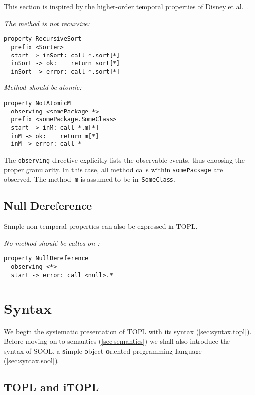 \documentclass{sigplanconf} %
\newcommand{\delimitVerbatim}{\par\nobreak\smallskip\noindent}
\theoremstyle{definition}
\theoremstyle{remark}
\begin{document}
This section is inspired by the higher-order temporal properties of Disney et al.~\cite{disney2011}.

\medskip\emph{The \Verb@sort@ method is not recursive:}
\delimitVerbatim
\begin{Verbatim}[commandchars=\\\{\}]
property RecursiveSort
  prefix <Sorter>
  start -> inSort: call *.sort[*]
  inSort -> ok:    return sort[*]
  inSort -> error: call *.sort[*]
\end{Verbatim}

\medskip\emph{Method~\Verb@m@ should be atomic:}
\delimitVerbatim
\begin{Verbatim}[commandchars=\\\{\}]
property NotAtomicM
  observing <somePackage.*>
  prefix <somePackage.SomeClass>
  start -> inM: call *.m[*]
  inM -> ok:    return m[*]
  inM -> error: call *
\end{Verbatim}
\delimitVerbatim
The \texttt{observing} directive explicitly lists the observable events, thus choosing the proper granularity.
In this case, all method calls within \texttt{somePackage} are observed.
The method~\texttt{m} is assumed to be in~\texttt{SomeClass}.

\subsection{Null Dereference} %

Simple non-temporal properties can also be expressed in TOPL.

\medskip\emph{No method should be called on \Verb@null@:}
\delimitVerbatim
\begin{Verbatim}
property NullDereference
  observing <*>
  start -> error: call <null>.*
\end{Verbatim}

\section{Syntax}\label{sec:syntax} %

We begin the systematic presentation of TOPL with its syntax (\autoref{sec:syntax.topl}).
Before moving on to semantics (\autoref{sec:semantics}) we shall also introduce the syntax of SOOL, a \textbf simple \textbf object-\textbf oriented programming \textbf language (\autoref{sec:syntax.sool}).

\subsection{TOPL and iTOPL}\label{sec:syntax.topl} %
\end{document}
